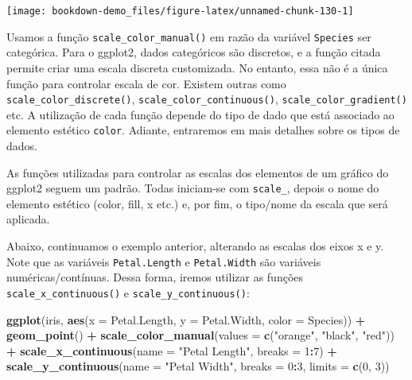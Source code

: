 \documentclass[]{book}
\newenvironment{Shaded}{\begin{snugshade}}{\end{snugshade}}
\newcommand{\KeywordTok}[1]{\textcolor[rgb]{0.13,0.29,0.53}{\textbf{#1}}}
\newcommand{\DataTypeTok}[1]{\textcolor[rgb]{0.13,0.29,0.53}{#1}}
\newcommand{\DecValTok}[1]{\textcolor[rgb]{0.00,0.00,0.81}{#1}}
\newcommand{\StringTok}[1]{\textcolor[rgb]{0.31,0.60,0.02}{#1}}
\newcommand{\OperatorTok}[1]{\textcolor[rgb]{0.81,0.36,0.00}{\textbf{#1}}}
\newcommand{\NormalTok}[1]{#1}
\begin{document}
\begin{center}\texttt{[image: bookdown-demo\_files/figure-latex/unnamed-chunk-130-1]} \end{center}

Usamos a função \texttt{scale\_color\_manual()} em razão da variável
\texttt{Species} ser categórica. Para o ggplot2, dados categóricos são
discretos, e a função citada permite criar uma escala discreta
customizada. No entanto, essa não é a única função para controlar escala
de cor. Existem outras como \texttt{scale\_color\_discrete()},
\texttt{scale\_color\_continuous()}, \texttt{scale\_color\_gradient()}
etc. A utilização de cada função depende do tipo de dado que está
associado ao elemento estético \texttt{color}. Adiante, entraremos em
mais detalhes sobre os tipos de dados.

As funções utilizadas para controlar as escalas dos elementos de um
gráfico do ggplot2 seguem um padrão. Todas iniciam-se com
\texttt{scale\_}, depois o nome do elemento estético (color, fill, x
etc.) e, por fim, o tipo/nome da escala que será aplicada.

Abaixo, continuamos o exemplo anterior, alterando as escalas dos eixos x
e y. Note que as variáveis \texttt{Petal.Length} e \texttt{Petal.Width}
são variáveis numéricas/contínuas. Dessa forma, iremos utilizar as
funções \texttt{scale\_x\_continuous()} e
\texttt{scale\_y\_continuous()}:

\begin{Shaded}
\begin{Highlighting}[]
\KeywordTok{ggplot}\NormalTok{(iris, }\KeywordTok{aes}\NormalTok{(}\DataTypeTok{x =}\NormalTok{ Petal.Length, }\DataTypeTok{y =}\NormalTok{ Petal.Width, }\DataTypeTok{color =}\NormalTok{ Species)) }\OperatorTok{+}
\StringTok{  }\KeywordTok{geom_point}\NormalTok{() }\OperatorTok{+}
\StringTok{  }\KeywordTok{scale_color_manual}\NormalTok{(}\DataTypeTok{values =} \KeywordTok{c}\NormalTok{(}\StringTok{"orange"}\NormalTok{, }\StringTok{"black"}\NormalTok{, }\StringTok{"red"}\NormalTok{)) }\OperatorTok{+}
\StringTok{  }\KeywordTok{scale_x_continuous}\NormalTok{(}\DataTypeTok{name =} \StringTok{"Petal Length"}\NormalTok{, }\DataTypeTok{breaks =} \DecValTok{1}\OperatorTok{:}\DecValTok{7}\NormalTok{) }\OperatorTok{+}\StringTok{ }
\StringTok{  }\KeywordTok{scale_y_continuous}\NormalTok{(}\DataTypeTok{name =} \StringTok{"Petal Width"}\NormalTok{, }\DataTypeTok{breaks =} \DecValTok{0}\OperatorTok{:}\DecValTok{3}\NormalTok{, }\DataTypeTok{limits =} \KeywordTok{c}\NormalTok{(}\DecValTok{0}\NormalTok{, }\DecValTok{3}\NormalTok{))}
\end{Highlighting}
\end{Shaded}
\end{document}
